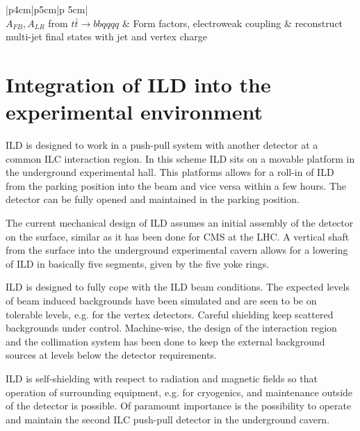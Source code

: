 \documentclass[%
 amsmath,amssymb,
 aps,
]{revtex4-1}
\begin{document}
\begin{table}[thb]
\begin{tabular}{|p{4cm}|p{5cm}|p {5cm}|}
\hline
{}\\
\hline
$A_{FB}, A_{LR}$ from $t \bar t \rightarrow bb qqqq$ & Form factors, electroweak coupling & reconstruct multi-jet final states with jet and vertex charge\\
\hline


    \end{tabular}
    \caption{Table of benchmark reactions which are used by ILD to optimize the detector performance. The channel, the physics motivation, and the main detector performance parameters are given.}
    \label{tab-benchmark}
\end{table}
\section{Integration of ILD into the experimental environment}
ILD is designed to work in a push-pull system with another detector at a common ILC interaction region. In this scheme ILD sits on a movable platform in the underground experimental hall. This platforms allows for a roll-in of ILD from the parking position into the beam and vice versa within a few hours. The detector can be fully opened and maintained in the parking position.

The current mechanical design of ILD assumes an initial assembly of the detector on the surface, similar as it has been done for CMS at the LHC. A vertical shaft from the surface into the underground experimental cavern allows for a lowering of ILD in basically five segments, given by the five yoke rings.

ILD is designed to fully cope with the ILD beam conditions. The expected levels of beam induced backgrounds have been simulated and are seen to be on tolerable levels, e.g. for the vertex detectors. Careful shielding keep scattered backgrounds under control. Machine-wise, the design of the interaction region and the collimation system has been done to keep the external background sources at levels below the detector requirements.

ILD is self-shielding with respect to radiation and magnetic fields so that operation of surrounding equipment, e.g. for cryogenics, and maintenance outside of the detector is possible. Of paramount importance is the possibility to operate and maintain the second ILC push-pull detector in the underground cavern.
\end{document}
